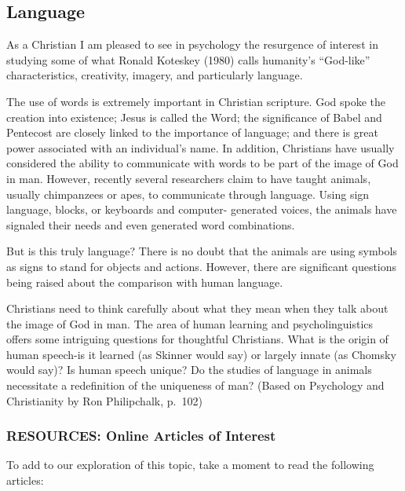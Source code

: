 \documentclass[
]{book}
\begin{document}
\hypertarget{language}{%
\subsection*{Language}\label{language}}

As a Christian I am pleased to see in psychology the resurgence of interest in studying some of what Ronald Koteskey (1980) calls humanity's ``God-like'' characteristics, creativity, imagery, and particularly language.

The use of words is extremely important in Christian scripture. God spoke the creation into existence; Jesus is called the Word; the significance of Babel and Pentecost are closely linked to the importance of language; and there is great power associated with an individual's name. In addition, Christians have usually considered the ability to communicate with words to be part of the image of God in man. However, recently several researchers claim to have taught animals, usually chimpanzees or apes, to communicate through language. Using sign language, blocks, or keyboards and computer- generated voices, the animals have signaled their needs and even generated word combinations.

But is this truly language? There is no doubt that the animals are using symbols as signs to stand for objects and actions. However, there are significant questions being raised about the comparison with human language.

Christians need to think carefully about what they mean when they talk about the image of God in man. The area of human learning and psycholinguistics offers some intriguing questions for thoughtful Christians. What is the origin of human speech-is it learned (as Skinner would say) or largely innate (as Chomsky would say)? Is human speech unique? Do the studies of language in animals necessitate a redefinition of the uniqueness of man? (Based on Psychology and Christianity by Ron Philipchalk, p.~102)

\hypertarget{resources-online-articles-of-interest-1}{%
\subsubsection*{RESOURCES: Online Articles of Interest}\label{resources-online-articles-of-interest-1}}

To add to our exploration of this topic, take a moment to read the following articles:
\end{document}
